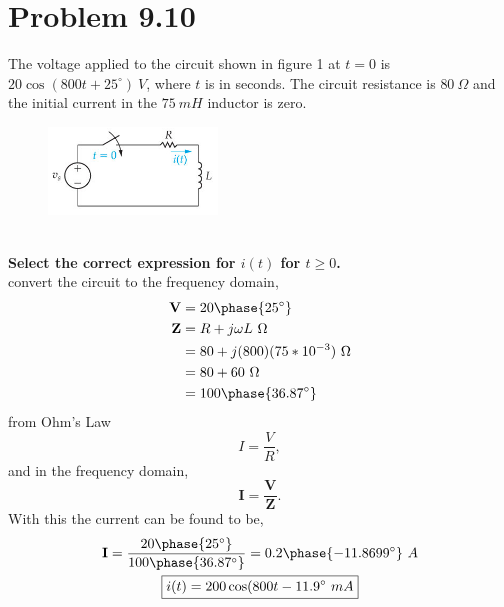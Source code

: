 \documentclass[12pt]{article}
\begin{document}
    \section*{Problem 9.10}
    The voltage applied to the circuit shown in figure 1 at $t = 0$ is $20 \cos
    (800t + 25^{\circ})\ V$, where $t$ is in seconds. The circuit resistance is
    $80\ \Omega$ and the initial current in the $75\ mH$ inductor is zero.
    \begin{figure}[h]
        \centering
        \includegraphics[width=0.4\textwidth]{9.10 Circuit.png}
    \end{figure} \\
    \textbf{Select the correct expression for $i(t)$ for $t \ge 0$.} \\
    convert the circuit to the frequency domain,
    \begin{align*}
        \textbf{V} &= 20 \phase{25^{\circ}} \\
        \textbf{Z} &= R + j \omega L\ \Omega \\
                   &= 80 + j(800)(75*10^{-3})\ \Omega \\
                   &= 80 + 60\ \Omega \\
                   &= 100 \phase{36.87^{\circ}}
    \end{align*}
    from Ohm's Law
    \[
        I = \frac{V}{R}
    ,\]
    and in the frequency domain,
    \[
        \textbf{I} = \frac{\textbf{V}}{\textbf{Z}}
    .\]
    With this the current can be found to be,
    \begin{gather*}
        \textbf{I} = \frac{20 \phase{25^{\circ}}}{100 \phase{36.87^{\circ}}} =
        0.2 \phase{-11.8699^{\circ}}\ A \\
        \boxed{i(t) = 200 \cos (800 t - 11.9^{\circ}\ mA}
    \end{gather*}
\end{document}
